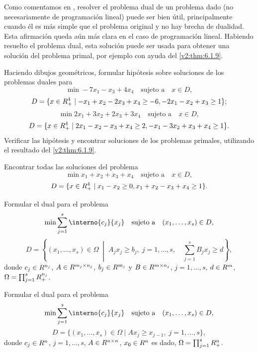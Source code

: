 Como comentamos en \cite[Capítulo 5]{SolodovVol1}, resolver el problema dual de un problema dado (no necesariamente de programación lineal) puede ser bien útil, principalmente cuando él es más simple que el problema original y no hay brecha de dualidad. Esta afirmación queda aún más clara en el caso de programación lineal. Habiendo resuelto el problema dual, esta solución puede ser usada para obtener una solución del problema primal, por ejemplo con ayuda del \cref{v2:thm:6.1.9}.

\begin{exercise}\label{v2:ejer:6.1.4}
    Haciendo dibujos geométricos, formular hipótesis sobre soluciones de los problemas duales para
    \[
        \min -7x_1 - x_3 + 4x_4 \quad \text{sujeto a} \quad x \in D,
    \]
    \[
        D = \{ x \in R^4_+ \mid -x_1 + x_2 - 2x_3 + x_4 \ge -6, -2x_1 - x_2 + x_3 \ge 1 \};
    \]
    \[
        \min 2x_1 + 3x_2 + 2x_3 + 3x_4 \quad \text{sujeto a} \quad x \in D,
    \]
    \[
        D = \{ x \in R^4_+ \mid 2x_1 - x_2 - x_3 + x_4 \ge 2, -x_1 - 3x_2 + x_3 + x_4 \ge 1 \}.
    \]
    Verificar las hipótesis y encontrar soluciones de los problemas primales, utilizando el resultado del \cref{v2:thm:6.1.9}.
\end{exercise}

\begin{exercise}\label{v2:ejer:6.1.5}
    Encontrar todas las soluciones del problema
    \[
        \min x_1 + x_2 + x_3 + x_4 \quad \text{sujeto a} \quad x \in D,
    \]
    \[
        D = \{ x \in R^4_+ \mid x_1 - x_2 \ge 0, x_1 + x_2 - x_3 + x_4 \ge 1 \}.
    \]
\end{exercise}

\begin{exercise}\label{v2:ejer:6.1.6}
    Formular el dual para el problema
    \[
        \min \sum_{j=1}^s \interno{c_j}{x_j} \quad \text{sujeto a} \quad (x_1, \dots, x_s) \in D,
    \]
    \[
        D = \left\{ (x_1, \dots, x_s) \in \Omega \;\middle|\; A_j x_j \ge b_j, \; j = 1, \dots, s, \quad \sum_{j=1}^s B_j x_j \ge d \right\},
    \]
    donde $c_j \in R^{n_j}$, $A \in R^{m_j \times n_j}$, $b_j \in R^{m_j}$ y $B \in R^{m \times n_j}$, $j = 1, \dots, s$, $d \in R^m$, $\Omega = \prod_{j=1}^s R^{n_j}_+$.
\end{exercise}

\begin{exercise}\label{v2:ejer:6.1.7}
    Formular el dual para el problema
    \[
        \min \sum_{j=1}^s \interno{c_j}{x_j} \quad \text{sujeto a} \quad (x_1, \dots, x_s) \in D,
    \]
    \[
        D = \{ (x_1, \dots, x_s) \in \Omega \mid A x_j \ge x_{j-1}, \; j = 1, \dots, s \},
    \]
    donde $c_j \in R^n$, $j = 1, \dots, s$, $A \in R^{n \times n}$, $x_0 \in R^n$ es dado, $\Omega = \prod_{j=1}^s R^n_+$.
\end{exercise}

